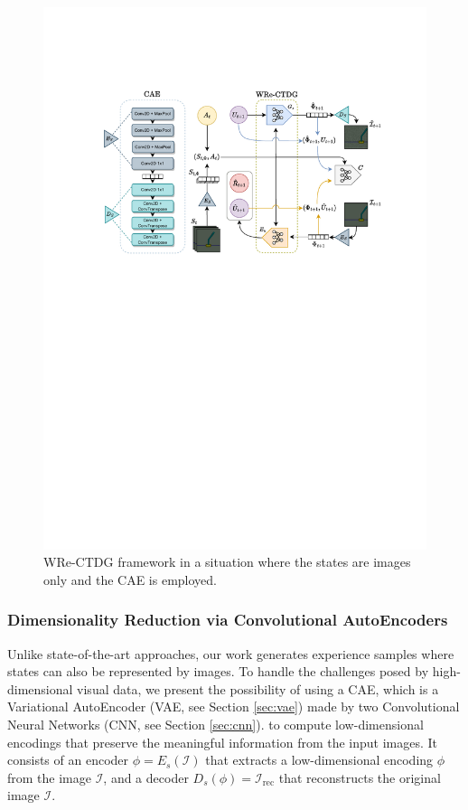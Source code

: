 \begin{figure}[ht]
    \centering
    \includegraphics[width=.95\textwidth]{figures/ch4/1.wre.pdf}
    \caption{WRe-CTDG framework in a situation where the states are
    images only and the CAE is employed.}
    \label{fig:wre}
\end{figure}

\subsubsection{Dimensionality Reduction via Convolutional AutoEncoders}

Unlike state-of-the-art approaches, our work generates experience samples
where states can also be represented by images. To handle the challenges posed
by high-dimensional visual data, we present the possibility of using a CAE,
which is a Variational AutoEncoder (VAE, see Section \ref{sec:vae})
made by two Convolutional Neural Networks (CNN, see Section \ref{sec:cnn}).
to compute low-dimensional encodings that preserve the meaningful
information from the input images.
It consists of an encoder \( \phi = E_s(\mathcal{I}) \)
that extracts a low-dimensional encoding \( \phi \)
from the image \( \mathcal{I} \), and a decoder
\( D_s(\phi) = \mathcal{I}_{\text{rec}} \)
that reconstructs the original image \( \mathcal{I} \).

